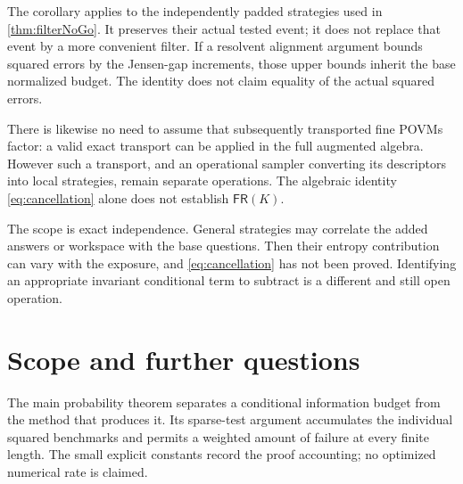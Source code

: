 \documentclass[11pt,reqno]{amsart}
\numberwithin{equation}{section}
\theoremstyle{definition}
\theoremstyle{remark}
\newcommand{\FR}{\mathsf{FR}}
\begin{document}
The corollary applies to the independently padded strategies used in \cref{thm:filterNoGo}. It preserves their actual tested event; it does not replace that event by a more convenient filter. If a resolvent alignment argument bounds squared errors by the Jensen-gap increments, those upper bounds inherit the base normalized budget. The identity does not claim equality of the actual squared errors.

There is likewise no need to assume that subsequently transported fine POVMs factor: a valid exact transport can be applied in the full augmented algebra. However such a transport, and an operational sampler converting its descriptors into local strategies, remain separate operations. The algebraic identity \eqref{eq:cancellation} alone does not establish \(\FR(K)\).

\begin{center}
\end{center}

The scope is exact independence. General strategies may correlate the added answers or workspace with the base questions. Then their entropy contribution can vary with the exposure, and \eqref{eq:cancellation} has not been proved. Identifying an appropriate invariant conditional term to subtract is a different and still open operation.



\section{Scope and further questions}\label{sec:discussion}
The main probability theorem separates a conditional information budget from the method that produces it. Its sparse-test argument accumulates the individual squared benchmarks and permits a weighted amount of failure at every finite length. The small explicit constants record the proof accounting; no optimized numerical rate is claimed.
\end{document}
